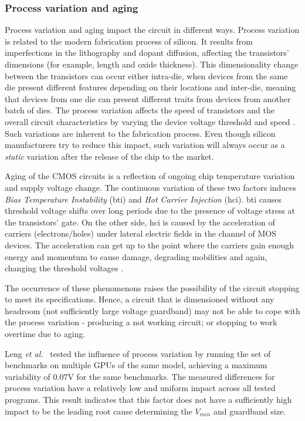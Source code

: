 \subsubsection{Process variation and aging}

Process variation and aging impact the circuit in different ways. Process variation is related to the modern fabrication process of silicon. It results from imperfections in the lithography and dopant diffusion, affecting the transistors' dimensions (for example, length and oxide thickness). This dimensionality change between the transistors can occur either intra-die, when devices from the same die present different features depending on their locations and inter-die, meaning that devices from one die can present different traits from devices from another batch of dies. The process variation affects the speed of transistors and the overall circuit characteristics by varying the device voltage threshold and speed \cite{schemmert_threshold-voltage_1974}\cite{thomas_core_2016}. Such variations are inherent to the fabrication process. Even though silicon manufacturers try to reduce this impact, such variation will always occur as a \textit{static} variation after the release of the chip to the market.

Aging of the CMOS circuits is a reflection of ongoing chip temperature variation and supply voltage change. The continuous variation of these two factors induces \textit{Bias Temperature Instability} (\acrshort{bti}) and  \textit{Hot Carrier Injection} (\acrshort{hci}). \acrshort{bti} causes threshold voltage shifts over long periods due to the presence of voltage stress at the transistors' gate. On the other side, \acrshort{hci} is caused by the acceleration of carriers (electrons/holes) under lateral electric fields in the channel of MOS devices. The acceleration can get up to the point where the carriers gain enough energy and momentum to cause damage, degrading mobilities and again, changing the threshold voltages 
\cite{sapatnekar_what_nodate}.

The occurrence of these phenomenons raises the possibility of the circuit stopping to meet its specifications. Hence, a circuit that is dimensioned without any headroom (not sufficiently large voltage guardband) may not be able to cope with the process variation - producing a not working circuit; or stopping to work overtime due to aging.

Leng \textit{et al.}~\cite{leng_safe_2015} tested the influence of process variation by running the set of benchmarks on multiple GPUs of the same model, achieving a maximum variability of 0.07V for the same benchmarks. The measured differences for process variation have a relatively low and uniform impact across all tested programs. This result indicates that this factor does not have a sufficiently high impact to be the leading root cause determining the $V_{min}$ and guardband size.


